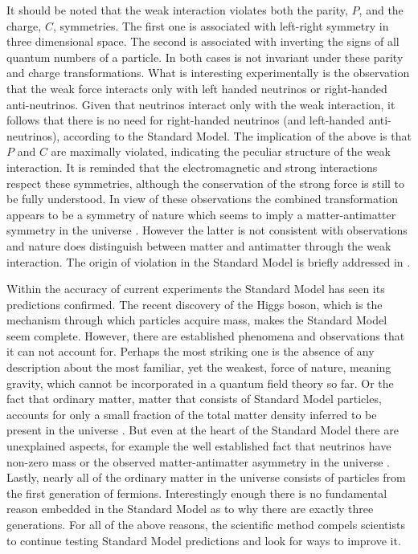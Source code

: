 It should be noted that the weak interaction violates both the parity, $P$, and the charge, $C$, symmetries.
The first one is associated with left-right symmetry in three dimensional space.
The second is associated with inverting the signs of all quantum numbers of a particle.
In both cases  is not invariant under these parity and charge transformations.
What is interesting experimentally is the observation \cite{wu-parity,garwin-parity} that the weak force interacts
only with left handed neutrinos or right-handed anti-neutrinos. Given that neutrinos interact only with the weak interaction,
it follows that there is no need for right-handed neutrinos (and left-handed anti-neutrinos), according to the Standard Model.
The implication of the above is that $P$ and $C$ are maximally violated, indicating the
peculiar structure of the weak interaction. It is reminded that the electromagnetic and
strong interactions respect these symmetries, although the \CP conservation of the strong force is still to be fully understood.
In view of these observations the combined \CP transformation appears to be
a symmetry of nature which seems to imply a matter-antimatter symmetry in the universe \cite{Sakharov:1967dj}.
However the latter is not consistent with observations and nature does distinguish between matter and antimatter
through the weak interaction. The origin of \CP violation in the Standard Model is briefly addressed in .

Within the accuracy of current experiments the Standard Model has seen its predictions confirmed.
The recent discovery of the Higgs boson, which is the mechanism through which particles acquire mass, makes the
Standard Model seem complete. However, there are established phenomena and observations that it can not
account for. Perhaps the most striking one is the absence of any description about the most familiar, yet the weakest,
force of nature, meaning gravity, which cannot be incorporated in a quantum field theory so far.
Or the fact that ordinary matter, \ie matter that consists of Standard Model particles, accounts for only a small
fraction of the total matter density inferred to be present in the universe \cite{dmatter-Hinshaw}. But even at the heart
of the Standard Model there are unexplained aspects, for example the well established fact that neutrinos have non-zero
mass \cite{nu-mass-superkam,nu-mass-kamland,nu-mass-sno,nu-mass-daya} or the observed
matter-antimatter asymmetry in the universe \cite{more-cpv-huet,more-cpv-gavela_I,more-cpv-gavela_II}.
Lastly, nearly all of the ordinary matter in the universe consists of
particles from the first generation of fermions. Interestingly enough there is no fundamental reason embedded in the Standard Model
as to why there are exactly three generations. For all of the above reasons, the scientific method compels scientists to continue
testing Standard Model predictions and look for ways to improve it.
